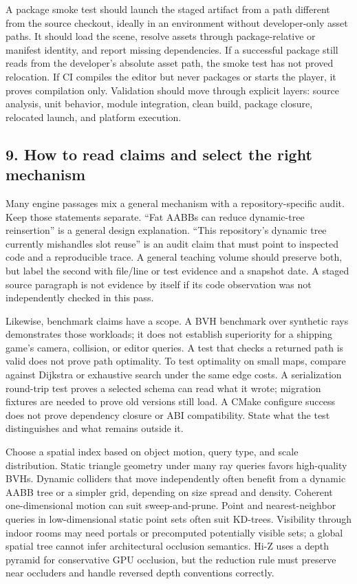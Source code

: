 A package smoke test should launch the staged artifact from a path different from the source checkout, ideally in an environment without developer-only asset paths. It should load the scene, resolve assets through package-relative or manifest identity, and report missing dependencies. If a successful package still reads from the developer's absolute asset path, the smoke test has not proved relocation. If CI compiles the editor but never packages or starts the player, it proves compilation only. Validation should move through explicit layers: source analysis, unit behavior, module integration, clean build, package closure, relocated launch, and platform execution.

\subsection{9. How to read claims and select the right mechanism}\label{05-engine-i-ch008-how-to-read-claims-and-select-the-right-mechanism}

\hypertarget{05-engine-i-ch008-how-to-read-claims-and-select-the-right-mechanism}{}

Many engine passages mix a general mechanism with a repository-specific audit. Keep those statements separate. ``Fat AABBs can reduce dynamic-tree reinsertion'' is a general design explanation. ``This repository's dynamic tree currently mishandles slot reuse'' is an audit claim that must point to inspected code and a reproducible trace. A general teaching volume should preserve both, but label the second with file/line or test evidence and a snapshot date. A staged source paragraph is not evidence by itself if its code observation was not independently checked in this pass.

Likewise, benchmark claims have a scope. A BVH benchmark over synthetic rays demonstrates those workloads; it does not establish superiority for a shipping game's camera, collision, or editor queries. A test that checks a returned path is valid does not prove path optimality. To test optimality on small maps, compare against Dijkstra or exhaustive search under the same edge costs. A serialization round-trip test proves a selected schema can read what it wrote; migration fixtures are needed to prove old versions still load. A CMake configure success does not prove dependency closure or ABI compatibility. State what the test distinguishes and what remains outside it.

Choose a spatial index based on object motion, query type, and scale distribution. Static triangle geometry under many ray queries favors high-quality BVHs. Dynamic colliders that move independently often benefit from a dynamic AABB tree or a simpler grid, depending on size spread and density. Coherent one-dimensional motion can suit sweep-and-prune. Point and nearest-neighbor queries in low-dimensional static point sets often suit KD-trees. Visibility through indoor rooms may need portals or precomputed potentially visible sets; a global spatial tree cannot infer architectural occlusion semantics. Hi-Z uses a depth pyramid for conservative GPU occlusion, but the reduction rule must preserve near occluders and handle reversed depth conventions correctly.

